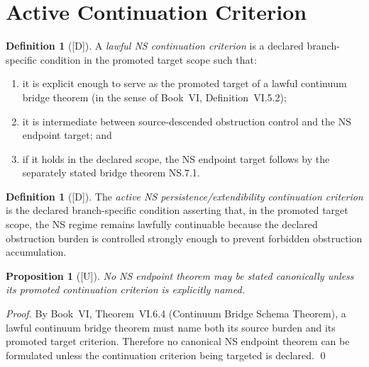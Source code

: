 \documentclass[12pt,oneside]{amsbook}
\theoremstyle{plain}
\newtheorem{proposition}[theorem]{Proposition}
\theoremstyle{definition}
\newtheorem{definition}[theorem]{Definition}
\theoremstyle{remark}
\newcommand{\status}[1]{\textup{[#1]}}
\begin{document}
\section{Active Continuation Criterion}
\label{sec:criterion}

\begin{definition}[\status{D}]\label{def:NS-continuation-criterion}
A \emph{lawful NS continuation criterion} is a declared
branch-specific condition in the promoted target scope such
that:
\begin{enumerate}[label=\textup{(\arabic*)}]
 \item it is explicit enough to serve as the promoted target of
 a lawful continuum bridge theorem (in the sense of
 Book~VI, Definition~VI.5.2);
 \item it is intermediate between source-descended obstruction
 control and the NS endpoint target; and
 \item if it holds in the declared scope, the NS endpoint
 target follows by the separately stated bridge theorem
 NS.7.1.
\end{enumerate}
\end{definition}

\begin{definition}[\status{D}]\label{def:NS-active-criterion}
The \emph{active NS persistence/extendibility continuation
criterion} is the declared branch-specific condition asserting
that, in the promoted target scope, the NS regime remains
lawfully continuable because the declared obstruction burden
is controlled strongly enough to prevent forbidden obstruction
accumulation.
\end{definition}

\begin{proposition}[\status{U}]\label{prop:NS-criterion-required}
No NS endpoint theorem may be stated canonically unless its
promoted continuation criterion is explicitly named.
\end{proposition}

\begin{proof}
By Book~VI, Theorem~VI.6.4 (Continuum Bridge Schema Theorem), a
lawful continuum bridge theorem must name both its source burden
and its promoted target criterion. Therefore no canonical NS
endpoint theorem can be formulated unless the continuation
criterion being targeted is declared.
\qed
\end{proof}
\end{document}
